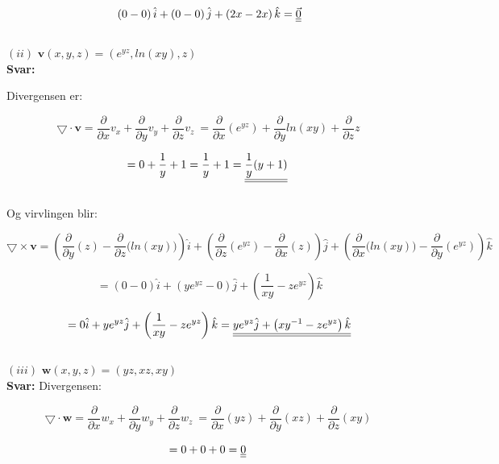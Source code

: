 \documentclass[a4paper,norsk,12pt]{article}
\begin{document}
$$
\def\doubleunderline#1{\underline{\underline{#1}}}
\left(0 - 0 \right) \hat i + \left(0 - 0 \right) \hat j + \left(2x - 2x \right) \hat k = \doubleunderline{\vec{0}}
$$\\



$(ii)$ \hspace{3mm} $\textbf{v}(x,y,z) = (e^{yz}, ln(xy), z) $ \\

\textbf{Svar:}

Divergensen er:


$$
\bigtriangledown \cdot \textbf{v} = \frac{\partial}{\partial x} v_x + \frac{\partial}{\partial y} v_y + \frac{\partial}{\partial z} v_z \  = \frac{\partial}{\partial x} (e^{yz})+ \frac{\partial}{\partial y} ln(xy) + \frac{\partial}{\partial z} z \
$$ 

$$
\def\doubleunderline#1{\underline{\underline{#1}}}
= 0 + \frac{1}{y} + 1 =  \frac{1}{y} + 1 = \doubleunderline{ \frac{1}{y} (y+1)} \
$$ \\

Og virvlingen blir:

$$
\bigtriangledown \times \textbf{v} 
= \left( \frac{\partial}{\partial y} (z) - \frac{\partial}{\partial z} \Big(ln(xy)\Big) \right) \hat i + \left(\frac{\partial}{\partial z} (e^{yz}) - \frac{\partial}{\partial x} (z) \right) \hat j + \left(\frac{\partial}{\partial x} \Big(ln(xy)\Big) - \frac{\partial}{\partial y} (e^{yz}) \right) \hat k
$$

$$
=\left(0 - 0 \right) \hat i + \left(ye^{yz} - 0 \right) \hat j + \left(\frac{1}{xy} - ze^{yz} \right) \hat k 
$$

$$
\def\doubleunderline#1{\underline{\underline{#1}}}
= 0 \hat i + ye^{yz} \hat j + \left( \frac{1}{xy} - ze^{yz} \right)\hat{k} = \doubleunderline{ ye^{yz} \hat j + \left( xy^{-1} - ze^{yz} \right)\hat{k} }
$$\\

$(iii)$ \hspace{3mm} $\textbf{w}(x,y,z) = (yz, xz, xy) $ \\

\textbf{Svar:}
Divergensen:\

$$
\bigtriangledown \cdot \textbf{w} = \frac{\partial}{\partial x} w_x + \frac{\partial}{\partial y} w_y + \frac{\partial}{\partial z} w_z \  = \frac{\partial}{\partial x} (yz)+ \frac{\partial}{\partial y} (xz) + \frac{\partial}{\partial z} (xy) \
$$ 

$$
\def\doubleunderline#1{\underline{\underline{#1}}}
= 0 + 0 + 0 =   \doubleunderline{ 0} \
$$ \
\end{document}
